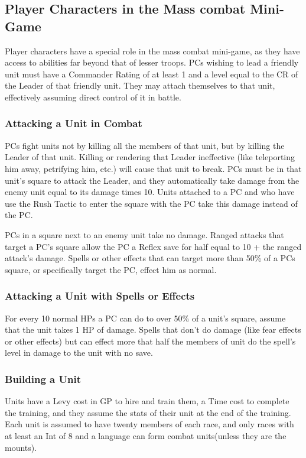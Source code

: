 \subsection{Player Characters in the Mass combat Mini-Game}

Player characters have a special role in the mass combat mini-game, as they have access to abilities far beyond that of lesser troops. PCs wishing to lead a friendly unit must have a Commander Rating of at least 1 and a level equal to the CR of the Leader of that friendly unit. They may attach themselves to that unit, effectively assuming direct control of it in battle.

\subsubsection{Attacking a Unit in Combat} PCs fight units not by killing all the members of that unit, but by killing the Leader of that unit. Killing or rendering that Leader ineffective (like teleporting him away, petrifying him, etc.) will cause that unit to break. PCs must be in that unit's square to attack the Leader, and they automatically take damage from the enemy unit equal to its damage times 10. Units attached to a PC and who have use the Rush Tactic to enter the square with the PC take this damage instead of the PC.

PCs in a square next to an enemy unit take no damage. Ranged attacks that target a PC's square allow the PC a Reflex save for half equal to 10 + the ranged attack's damage. Spells or other effects that can target more than 50\% of a PCs square, or specifically target the PC, effect him as normal.

\subsubsection{Attacking a Unit with Spells or Effects} For every 10 normal HPs a PC can do to over 50\% of a unit's square, assume that the unit takes 1 HP of damage. Spells that don't do damage (like fear effects or other effects) but can effect more that half the members of unit do the spell's level in damage to the unit with no save.

\subsubsection{Building a Unit} Units have a Levy cost in GP to hire and train them, a Time cost to complete the training, and they assume the stats of their unit at the end of the training. Each unit is assumed to have twenty members of each race, and only races with at least an Int of 8 and a language can form combat units(unless they are the mounts).

